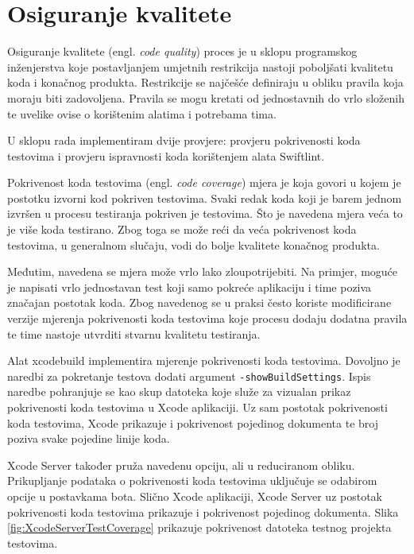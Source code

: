 \documentclass[times, utf8, diplomski, numeric]{fer}
\newcommand{\eng}[1]{(engl. \textit{#1})}
\begin{document}
\section{Osiguranje kvalitete}

Osiguranje kvalitete \eng{code quality} proces je u sklopu programskog inženjerstva koje postavljanjem umjetnih restrikcija nastoji poboljšati kvalitetu koda i konačnog produkta. Restrikcije se najčešće definiraju u obliku pravila koja moraju biti zadovoljena. Pravila se mogu kretati od jednostavnih do vrlo složenih te uvelike ovise o korištenim alatima i potrebama tima.

U sklopu rada implementiram dvije provjere: provjeru pokrivenosti koda testovima i provjeru ispravnosti koda korištenjem alata Swiftlint.

Pokrivenost koda testovima \eng{code coverage} mjera je koja govori u kojem je postotku izvorni kod pokriven testovima. Svaki redak koda koji je barem jednom izvršen u procesu testiranja pokriven je testovima. Što je navedena mjera veća to je više koda testirano. Zbog toga se može reći da veća pokrivenost koda testovima, u generalnom slučaju, vodi do bolje kvalitete konačnog produkta.

Međutim, navedena se mjera može vrlo lako zloupotrijebiti. Na primjer, moguće je napisati vrlo jednostavan test koji samo pokreće aplikaciju i time poziva značajan postotak koda. Zbog navedenog se u praksi često koriste modificirane verzije mjerenja pokrivenosti koda testovima koje procesu dodaju dodatna pravila te time nastoje utvrditi stvarnu kvalitetu testiranja\citep{wiki:CodeCoverage}.

Alat xcodebuild implementira mjerenje pokrivenosti koda testovima. Dovoljno je naredbi za pokretanje testova dodati argument \verb|-showBuildSettings|. Ispis naredbe pohranjuje se kao skup datoteka koje služe za vizualan prikaz pokrivenosti koda testovima u Xcode aplikaciji. Uz sam postotak pokrivenosti koda testovima, Xcode prikazuje i pokrivenost pojedinog dokumenta te broj poziva svake pojedine linije koda.

Xcode Server također pruža navedenu opciju, ali u reduciranom obliku. Prikupljanje podataka o pokrivenosti koda testovima uključuje se odabirom opcije  u postavkama bota. Slično Xcode aplikaciji, Xcode Server uz postotak pokrivenosti koda testovima prikazuje i pokrivenost pojedinog dokumenta. Slika \ref{fig:XcodeServerTestCoverage} prikazuje pokrivenost datoteka testnog projekta testovima.
\end{document}
